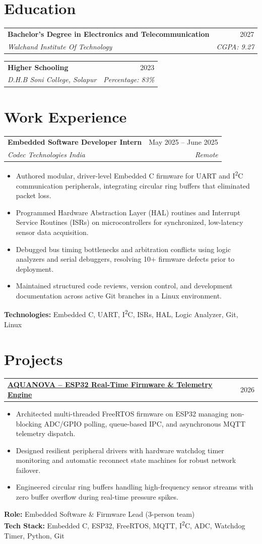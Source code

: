 \documentclass[letterpaper,10pt]{article}
\makeatletter
\newcommand{\resumeItemListStart}{\begin{itemize}[leftmargin=0.18in, topsep=1.5pt, parsep=0pt, itemsep=1pt]}
\newcommand{\resumeItemListEnd}{\end{itemize}\vspace{-4pt}}
\newcommand{\resumeItem}[1]{\item\small{#1}}
\newcommand{\resumeSubheading}[4]{
  \vspace{-1pt}
  \begin{tabular*}{\textwidth}[t]{l@{\extracolsep{\fill}}r}
    \textbf{#1} & #2 \\
    \textit{\small#3} & \textit{\small #4} \\
  \end{tabular*}\vspace{-4pt}
}
\newcommand{\resumeProjectHeading}[2]{
  \vspace{-1pt}
  \begin{tabular*}{\textwidth}[t]{l@{\extracolsep{\fill}}r}
    \textbf{#1} & #2 \\
  \end{tabular*}\vspace{-4pt}
}
\makeatother
\begin{document}
\vspace{-6pt}

\section{Education}
\resumeSubheading
  {Bachelor's Degree in Electronics and Telecommunication}{2027}
  {Walchand Institute Of Technology}{CGPA: 9.27}
\resumeSubheading
  {Higher Schooling}{2023}
  {D.H.B Soni College, Solapur}{Percentage: 83\%}

\vspace{-2pt}

\section{Work Experience}
\resumeSubheading
  {Embedded Software Developer Intern}{May 2025 -- June 2025}
  {Codec Technologies India}{Remote}
\resumeItemListStart
  \resumeItem{Authored modular, driver-level Embedded C firmware for UART and I\textsuperscript{2}C communication peripherals, integrating circular ring buffers that eliminated packet loss.}
  \resumeItem{Programmed Hardware Abstraction Layer (HAL) routines and Interrupt Service Routines (ISRs) on microcontrollers for synchronized, low-latency sensor data acquisition.}
  \resumeItem{Debugged bus timing bottlenecks and arbitration conflicts using logic analyzers and serial debuggers, resolving 10+ firmware defects prior to deployment.}
  \resumeItem{Maintained structured code reviews, version control, and development documentation across active Git branches in a Linux environment.}
\resumeItemListEnd
\small{\textbf{Technologies:} Embedded C, UART, I\textsuperscript{2}C, ISRs, HAL, Logic Analyzer, Git, Linux}

\vspace{-2pt}

\section{Projects}

\resumeProjectHeading
  {\href{https://github.com/AdityaMittha/AQUANOVA}{\textbf{AQUANOVA -- ESP32 Real-Time Firmware \& Telemetry Engine}}}{2026}
\resumeItemListStart
  \resumeItem{Architected multi-threaded FreeRTOS firmware on ESP32 managing non-blocking ADC/GPIO polling, queue-based IPC, and asynchronous MQTT telemetry dispatch.}
  \resumeItem{Designed resilient peripheral drivers with hardware watchdog timer monitoring and automatic reconnect state machines for robust network failover.}
  \resumeItem{Engineered circular ring buffers handling high-frequency sensor streams with zero buffer overflow during real-time pressure spikes.}
\resumeItemListEnd
\small{\textbf{Role:} Embedded Software \& Firmware Lead (3-person team)} \\
\small{\textbf{Tech Stack:} Embedded C, ESP32, FreeRTOS, MQTT, I\textsuperscript{2}C, ADC, Watchdog Timer, Python, Git}
\end{document}
